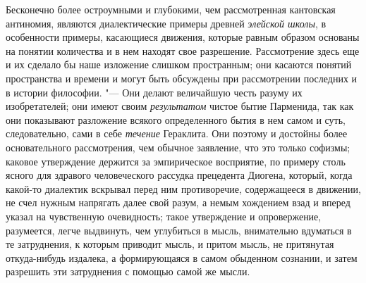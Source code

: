 Бесконечно более остроумными и глубокими, чем рассмотренная кантовская
антиномия, являются диалектические примеры древней
{\em элейской школы}, в особенности примеры, касающиеся
движения, которые равным образом основаны на понятии количества и в нем
находят свое разрешение. Рассмотрение здесь еще и их сделало бы наше
изложение слишком пространным; они касаются понятий пространства и времени
и могут быть обсуждены при рассмотрении последних и в истории философии. "---
Они делают величайшую честь разуму их изобретателей; они имеют своим
{\em результатом} чистое бытие Парменида, так как они
показывают разложение всякого определенного бытия в нем самом и суть,
следовательно, сами в себе {\em течение} Гераклита. Они
поэтому и достойны более основательного рассмотрения, чем обычное
заявление, что это только софизмы; каковое утверждение держится за
эмпирическое восприятие, по примеру столь ясного для здравого человеческого
рассудка прецедента Диогена, который, когда какой-то диалектик вскрывал
перед ним противоречие, содержащееся в движении, не счел нужным напрягать
далее свой разум, а немым хождением взад и вперед указал на чувственную
очевидность; такое утверждение и опровержение, разумеется, легче выдвинуть,
чем углубиться в мысль, внимательно вдуматься в те затруднения, к которым
приводит мысль, и притом мысль, не притянутая откуда-нибудь издалека, а
формирующаяся в самом обыденном сознании, и затем разрешить эти затруднения
с помощью самой же мысли.

